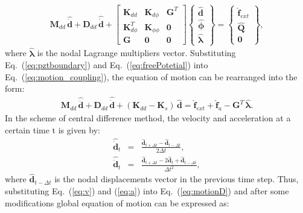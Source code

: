 \begin{eqnarray}
	\label{eq:motion_coupling}
	\textbf{M}_{dd}\,\widehat{\ddot{\textbf{d}}} +
	\textbf{D}_{dd}\,\widehat{\dot{\textbf{d}}} +
	\left [\begin{array}{ccc}
		\textbf{K}_{dd}&\textbf{K}_{d\phi}&\textbf{G}^T\\
		\textbf{K}_{d\phi}^T&\textbf{K}_{\phi \phi}&\textbf{0}\\
		\textbf{G}&\textbf{0}&\textbf{0}
	\end{array}\right]
	\left \{\begin{array}{c}
		\widehat{\textbf{d}}\\
		\widehat{\boldsymbol{\phi}}\\
		\widehat{\boldsymbol{\lambda}}
	\end{array}\right\} =
	\left \{\begin{array}{c}
		\widehat{\textbf{f}}_{ext} \\
		\widehat{\textbf{Q}}\\
		\textbf{0}
	\end{array}\right \},
\end{eqnarray}
where \(\widehat{\boldsymbol{\lambda}}\) is the nodal Lagrange multipliers vector.
Substituting Eq.~(\ref{eq:pztboundary}) and Eq.~(\ref{eq:freePotetial}) into Eq.~(\ref{eq:motion_coupling}), the equation of motion can be rearranged into the form:
\begin{eqnarray}
	\textbf{M}_{dd}\,\widehat{\ddot{\textbf{d}}} + \textbf{D}_{dd} \,\widehat{\dot{\textbf{d}}} + (\textbf{K}_{dd}-\textbf{K}_{s}) \,\widehat{\textbf{d}}  = \widehat{\textbf{f}}_{ext} + \widehat{\textbf{f}}_{a} - \textbf{G}^T\,\widehat{\boldsymbol{\lambda}}.
	\label{eq:motionD}
\end{eqnarray}
In the scheme of central difference method, the velocity and acceleration at a certain time t is given by:
\begin{eqnarray}
	\label{eq:v}
	\widehat{\dot{\textbf{d}}}_{t} & = & \frac{\widehat{\textbf{d}}_{t+\Delta t} - \widehat{\textbf{d}}_{t-\Delta t}}{2\Delta t},\\
	\label{eq:a}
	\widehat{\ddot{\textbf{d}}}_{t} & = & \frac{\widehat{\textbf{d}}_{t+\Delta t} - 2\widehat{\textbf{d}}_{t} + \widehat{\textbf{d}}_{t-\Delta t}}{\Delta t^2},
\end{eqnarray}
where \(\widehat{\textbf{d}}_{t-\Delta t}\) is the nodal displacements vector in the previous time step.
Thus, substituting Eq.~(\ref{eq:v}) and (\ref{eq:a}) into Eq.~(\ref{eq:motionD}) and after some modifications global equation of motion can be expressed as:
